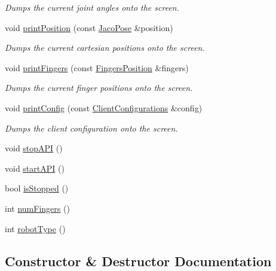 \begin{DoxyCompactItemize}
\begin{DoxyCompactList}\small\item\em Dumps the current joint angles onto the screen. \end{DoxyCompactList}\item 
void \hyperlink{classjaco_1_1_jaco_comm_ac1abf65387fa9adba237802bc97f15b1}{print\+Position} (const \hyperlink{classjaco_1_1_jaco_pose}{Jaco\+Pose} \&position)
\begin{DoxyCompactList}\small\item\em Dumps the current cartesian positions onto the screen. \end{DoxyCompactList}\item 
void \hyperlink{classjaco_1_1_jaco_comm_ab34f7cbb2978e76644927b9031e06b4f}{print\+Fingers} (const \hyperlink{struct_fingers_position}{Fingers\+Position} \&fingers)
\begin{DoxyCompactList}\small\item\em Dumps the current finger positions onto the screen. \end{DoxyCompactList}\item 
void \hyperlink{classjaco_1_1_jaco_comm_a54661eeda2fc5324843a230bdcfe8b67}{print\+Config} (const \hyperlink{struct_client_configurations}{Client\+Configurations} \&config)
\begin{DoxyCompactList}\small\item\em Dumps the client configuration onto the screen. \end{DoxyCompactList}\item 
void \hyperlink{classjaco_1_1_jaco_comm_a54862830cd6414ae3ae48e46e54bf798}{stop\+A\+PI} ()
\item 
void \hyperlink{classjaco_1_1_jaco_comm_a6b2a1fabc4e6c30da42c9a5e26757398}{start\+A\+PI} ()
\item 
bool \hyperlink{classjaco_1_1_jaco_comm_a872b8033cda5a9fe4ccdca2e89aa03d1}{is\+Stopped} ()
\item 
int \hyperlink{classjaco_1_1_jaco_comm_a42e11ee165ee8f2b1af7e7060f488ce1}{num\+Fingers} ()
\item 
int \hyperlink{classjaco_1_1_jaco_comm_af20323ed50f73b59bac3e18ebd8559fa}{robot\+Type} ()
\end{DoxyCompactItemize}


\subsection{Constructor \& Destructor Documentation}
